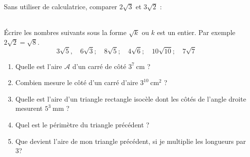 \documentclass[main.tex]{subfiles}
\begin{document}
\begin{example} Sans utiliser de calculatrice, comparer $2\sqrt{3}$ et $3\sqrt{2}$ :
	
	\vfill 
\end{example}

\begin{exercise}\hfill \\
	Écrire les nombres suivants sous la forme $\sqrt{k}$ ou $k$ est un entier. Par exemple $2\sqrt{2}=\sqrt{8}$.  
	$$ 3\sqrt{5},\quad 6\sqrt{3}; \quad 8\sqrt{5}; \quad 4\sqrt{6}; \quad 10\sqrt{10}; \quad 7\sqrt{7} $$
\end{exercise}
\begin{exercise}\hfill  
	\begin{enumerate}[label={\alph*)},leftmargin=*]
		\item Quelle est l'aire $\mathscr{A}$ d'un carré de côté $3^7~\si{\centi\meter}$ ?
		\item Combien mesure le côté d'un carré d'aire $3^{10}~\si{\centi\meter^2}$ ? 
		\item Quelle est l'aire d'un triangle rectangle isocèle dont les côtés de l'angle droite mesurent $5^3~\si{\milli\meter}$ ? 
		\item Quel est le périmètre du triangle précédent ?
		\item Que devient l'aire de mon triangle précédent, si je multiplie les longueurs par 3? 
	\end{enumerate}
\end{exercise} 
\end{document}
